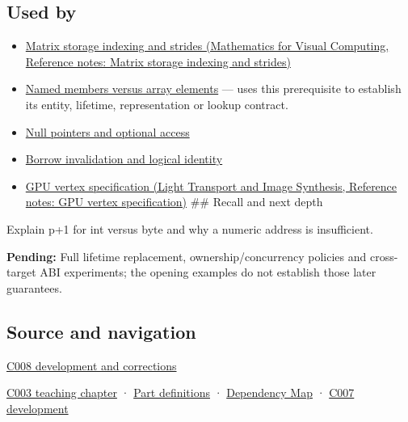 \subsection{Used by}\label{appendix-6af5921bc853-used-by}

\begin{itemize}
\item
  \href{../02-Mathematics-for-Visual-Computing/main.pdf\#nameddest=appendix-ffdc1d4e5350}{Matrix storage indexing and strides (Mathematics for Visual Computing, Reference notes: Matrix storage indexing and strides)}
\item
  \hyperref[appendix-3f7e15effba6]{Named members versus array elements} --- uses this prerequisite to establish its entity, lifetime, representation or lookup contract.
\item
  \hyperref[appendix-afae48c31800]{Null pointers and optional access}
\item
  \hyperref[appendix-f9b8b9188c7f]{Borrow invalidation and logical identity}
\item
  \href{../04-Light-Transport-and-Image-Synthesis/main.pdf\#nameddest=appendix-749ba51a6c25}{GPU vertex specification (Light Transport and Image Synthesis, Reference notes: GPU vertex specification)} \#\# Recall and next depth
\end{itemize}

Explain p+1 for int versus byte and why a numeric address is insufficient.

\textbf{Pending:} Full lifetime replacement, ownership/concurrency policies and cross-target ABI experiments; the opening examples do not establish those later guarantees.

\subsection{Source and navigation}\label{appendix-6af5921bc853-source-and-navigation}

\hyperref[appendix-fd090d982a15-m008---parts-113-126]{C008 development and corrections}

\hyperref[01-foundations-i-ch002-where-the-bytes-live]{C003 teaching chapter} · \hyperref[appendix-fd090d982a15-m003---parts-41-60]{Part definitions} · \hyperref[appendix-4ad47bdd269a]{Dependency Map} · \hyperref[01-foundations-i-ch003-bringing-the-object-model-back-to-bytes]{C007 development}
